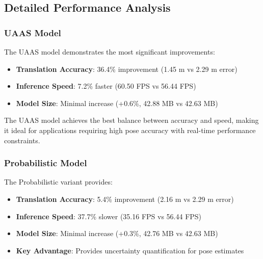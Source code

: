 \documentclass[conference]{IEEEtran}
\begin{document}
\begin{table}[h]
\centering
\caption{Performance Comparison Across Models}
\label{tab:comparison}
\end{table}

\subsection{Detailed Performance Analysis}

\subsubsection{UAAS Model}
The UAAS model demonstrates the most significant improvements:
\begin{itemize}
    \item \textbf{Translation Accuracy}: 36.4\% improvement (1.45 m vs 2.29 m error)
    \item \textbf{Inference Speed}: 7.2\% faster (60.50 FPS vs 56.44 FPS)
    \item \textbf{Model Size}: Minimal increase (+0.6\%, 42.88 MB vs 42.63 MB)
\end{itemize}

The UAAS model achieves the best balance between accuracy and speed, making it ideal for applications requiring high pose accuracy with real-time performance constraints.

\subsubsection{Probabilistic Model}
The Probabilistic variant provides:
\begin{itemize}
    \item \textbf{Translation Accuracy}: 5.4\% improvement (2.16 m vs 2.29 m error)
    \item \textbf{Inference Speed}: 37.7\% slower (35.16 FPS vs 56.44 FPS)
    \item \textbf{Model Size}: Minimal increase (+0.3\%, 42.76 MB vs 42.63 MB)
    \item \textbf{Key Advantage}: Provides uncertainty quantification for pose estimates
\end{itemize}
\end{document}
